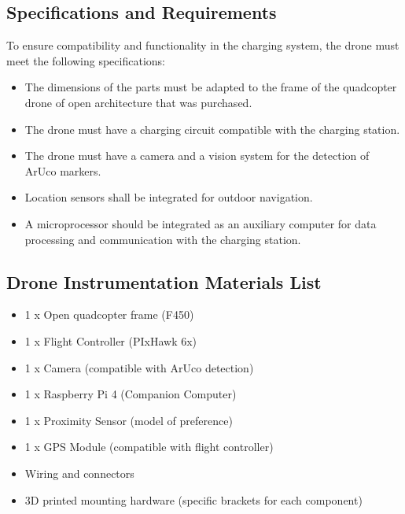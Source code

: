 \subsection{Specifications and Requirements}
To ensure compatibility and functionality in the charging system, the drone must meet the following specifications:
    \begin{itemize}
        \item The dimensions of the parts must be adapted to the frame of the quadcopter drone of open architecture that was purchased.
        \item The drone must have a charging circuit compatible with the charging station.
        \item The drone must have a camera and a vision system for the detection of ArUco markers.
        \item Location sensors shall be integrated for outdoor navigation.
        \item A microprocessor should be integrated as an auxiliary computer for data processing and communication with the charging station.
    \end{itemize}

\subsection{Drone Instrumentation Materials List} 
    \begin{itemize} 
        \item 1 x Open quadcopter frame (F450) 
        \item 1 x Flight Controller (PIxHawk 6x) 
        \item 1 x Camera (compatible with ArUco detection) 
        \item 1 x Raspberry Pi 4 (Companion Computer) 
        \item 1 x Proximity Sensor (model of preference) 
        \item 1 x GPS Module (compatible with flight controller) 
        \item Wiring and connectors 
        \item 3D printed mounting hardware (specific brackets for each component) 
    \end{itemize}


